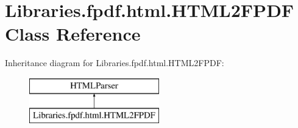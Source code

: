 \hypertarget{class_libraries_1_1fpdf_1_1html_1_1_h_t_m_l2_f_p_d_f}{}\section{Libraries.\+fpdf.\+html.\+H\+T\+M\+L2\+F\+P\+DF Class Reference}
\label{class_libraries_1_1fpdf_1_1html_1_1_h_t_m_l2_f_p_d_f}
Inheritance diagram for Libraries.\+fpdf.\+html.\+H\+T\+M\+L2\+F\+P\+DF\+:\begin{figure}[H]
\begin{center}
\leavevmode
\includegraphics[height=2.000000cm]{class_libraries_1_1fpdf_1_1html_1_1_h_t_m_l2_f_p_d_f}
\end{center}
\end{figure}
